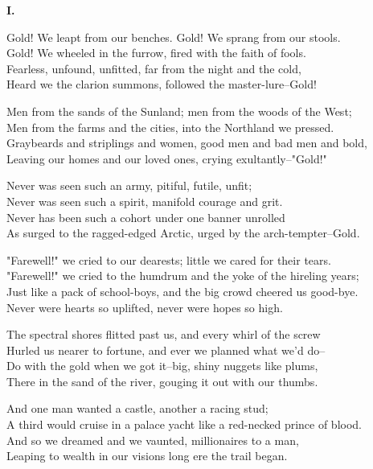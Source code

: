 
\begin{poemblock}
\textbf{I.}

Gold!  We leapt from our benches.  Gold!  We sprang from our stools.\\
Gold!  We wheeled in the furrow, fired with the faith of fools.\\
Fearless, unfound, unfitted, far from the night and the cold,\\
Heard we the clarion summons, followed the master-lure--Gold!

Men from the sands of the Sunland; men from the woods of the West;\\
Men from the farms and the cities, into the Northland we pressed.\\
Graybeards and striplings and women, good men and bad men and bold,\\
Leaving our homes and our loved ones, crying exultantly--"Gold!"

Never was seen such an army, pitiful, futile, unfit;\\
Never was seen such a spirit, manifold courage and grit.\\
Never has been such a cohort under one banner unrolled\\
As surged to the ragged-edged Arctic, urged by the arch-tempter--Gold.

"Farewell!" we cried to our dearests; little we cared for their tears.\\
"Farewell!" we cried to the humdrum and the yoke of the hireling years;\\
Just like a pack of school-boys, and the big crowd cheered us good-bye.\\
Never were hearts so uplifted, never were hopes so high.

The spectral shores flitted past us, and every whirl of the screw\\
Hurled us nearer to fortune, and ever we planned what we'd do--\\
Do with the gold when we got it--big, shiny nuggets like plums,\\
There in the sand of the river, gouging it out with our thumbs.

And one man wanted a castle, another a racing stud;\\
A third would cruise in a palace yacht like a red-necked prince of blood.\\
And so we dreamed and we vaunted, millionaires to a man,\\
Leaping to wealth in our visions long ere the trail began.


\end{poemblock}
